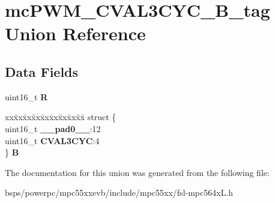 \hypertarget{unionmcPWM__CVAL3CYC__16B__tag}{}\section{mc\+P\+W\+M\+\_\+\+C\+V\+A\+L3\+C\+Y\+C\+\_\+B\+\_\+tag Union Reference}
\label{unionmcPWM__CVAL3CYC__16B__tag}
\subsection*{Data Fields}
\begin{DoxyCompactItemize}
\item 
\mbox{\label{unionmcPWM__CVAL3CYC__16B__tag_a78e1a88bc7be58c30ee26126de1a4778}} 
uint16\+\_\+t {\bfseries R}
\item 
\mbox{\label{unionmcPWM__CVAL3CYC__16B__tag_ad383adbed54d8c68af75140534be30bb}} 
\begin{tabbing}
xx\=xx\=xx\=xx\=xx\=xx\=xx\=xx\=xx\=\kill
struct \{\\
\>uint16\_t {\bfseries \_\_pad0\_\_}:12\\
\>uint16\_t {\bfseries CVAL3CYC}:4\\
\} {\bfseries B}\\

\end{tabbing}\end{DoxyCompactItemize}


The documentation for this union was generated from the following file\+:\begin{DoxyCompactItemize}
\item 
bsps/powerpc/mpc55xxevb/include/mpc55xx/fsl-\/mpc564x\+L.\+h\end{DoxyCompactItemize}
